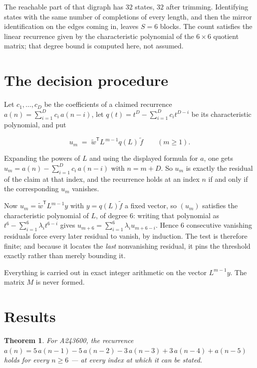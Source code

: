 \documentclass[11pt]{article}
\newtheorem{theorem}{Theorem}
\theoremstyle{definition}
\begin{document}
The reachable part of that digraph has $32$ states, $32$ after trimming. Identifying states with the same number of completions of every length, and then the mirror identification on the edges coming in, leaves $S = 6$ blocks. The count satisfies the linear recurrence given by the characteristic polynomial of the $6\times6$ quotient matrix; that degree bound is computed here, not assumed.

\section{The decision procedure}

Let $c_1,\dots,c_D$ be the coefficients of a claimed recurrence $a(n) = \sum_{i=1}^{D} c_i\,a(n-i)$, let $q(t) = t^{D} - \sum_{i=1}^{D} c_i t^{D-i}$ be its characteristic polynomial, and put

\[u_m \;=\; \tilde w^{\mathsf T} L^{\,m-1} q(L)\,\tilde f \qquad (m \ge 1).\]

Expanding the powers of $L$ and using the displayed formula for $a$, one gets $u_m = a(n) - \sum_{i=1}^{D} c_i\,a(n-i)$ with $n = m + D$. So $u_m$ is exactly the residual of the claim at that index, and the recurrence holds at an index $n$ if and only if the corresponding $u_m$ vanishes.

Now $u_m = \tilde w^{\mathsf T} L^{m-1} y$ with $y = q(L)\tilde f$ a fixed vector, so $(u_m)$ satisfies the characteristic polynomial of $L$, of degree $6$: writing that polynomial as $t^{6} - \sum_{i=1}^{6} \lambda_i t^{6-i}$ gives $u_{m+6} = \sum_{i=1}^{6} \lambda_i u_{m+6-i}$. Hence $6$ consecutive vanishing residuals force every later residual to vanish, by induction. The test is therefore finite; and because it locates the {\itshape last} nonvanishing residual, it pins the threshold exactly rather than merely bounding it.

Everything is carried out in exact integer arithmetic on the vector $L^{m-1}y$. The matrix $M$ is never formed.

\section{Results}

\begin{theorem} For A243600, the recurrence $a(n) = 5\,a(n-1) - 5\,a(n-2) - 3\,a(n-3) + 3\,a(n-4) + a(n-5)$ holds for every $n \ge 6$ --- at every index at which it can be stated.\end{theorem}
\end{document}
